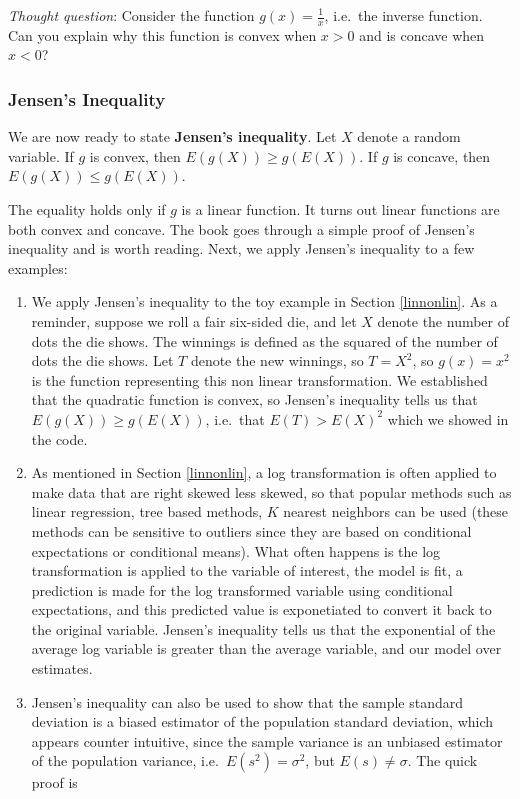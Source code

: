 \documentclass[
]{book}
\begin{document}
\emph{Thought question}: Consider the function \(g(x) = \frac{1}{x}\), i.e.~the inverse function. Can you explain why this function is convex when \(x>0\) and is concave when \(x<0\)?

\subsubsection{Jensen's Inequality}\label{jensens-inequality-1}

We are now ready to state \textbf{Jensen's inequality}. Let \(X\) denote a random variable. If \(g\) is convex, then \(E(g(X)) \geq g(E(X))\). If \(g\) is concave, then \(E(g(X)) \leq g(E(X))\).

The equality holds only if \(g\) is a linear function. It turns out linear functions are both convex and concave. The book goes through a simple proof of Jensen's inequality and is worth reading. Next, we apply Jensen's inequality to a few examples:

\begin{enumerate}
\def\labelenumi{\arabic{enumi}.}
\item
  We apply Jensen's inequality to the toy example in Section \ref{linnonlin}. As a reminder, suppose we roll a fair six-sided die, and let \(X\) denote the number of dots the die shows. The winnings is defined as the squared of the number of dots the die shows. Let \(T\) denote the new winnings, so \(T = X^2\), so \(g(x) = x^2\) is the function representing this non linear transformation. We established that the quadratic function is convex, so Jensen's inequality tells us that \(E(g(X)) \geq g(E(X))\), i.e.~that \(E(T) > E(X)^2\) which we showed in the code.
\item
  As mentioned in Section \ref{linnonlin}, a log transformation is often applied to make data that are right skewed less skewed, so that popular methods such as linear regression, tree based methods, \(K\) nearest neighbors can be used (these methods can be sensitive to outliers since they are based on conditional expectations or conditional means). What often happens is the log transformation is applied to the variable of interest, the model is fit, a prediction is made for the log transformed variable using conditional expectations, and this predicted value is exponetiated to convert it back to the original variable. Jensen's inequality tells us that the exponential of the average log variable is greater than the average variable, and our model over estimates.
\item
  Jensen's inequality can also be used to show that the sample standard deviation is a biased estimator of the population standard deviation, which appears counter intuitive, since the sample variance is an unbiased estimator of the population variance, i.e.~\(E(s^2) = \sigma^2\), but \(E(s) \neq \sigma\). The quick proof is
\end{enumerate}
\end{document}
